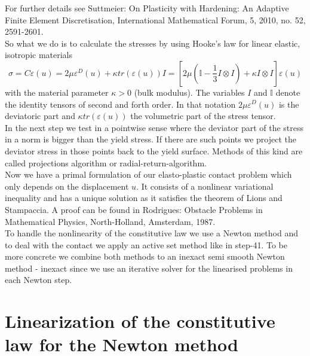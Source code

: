\documentclass{article}
\begin{document}
For further details see Suttmeier: On Plasticity with Hardening:
An Adaptive Finite Element Discretisation, International Mathematical Forum, 5,
2010, no. 52, 2591-2601.\\
So what we do is to calculate the stresses
by using Hooke's law for linear elastic,  isotropic materials $$\sigma = C \varepsilon(u) = 2\mu \varepsilon^D(u) + \kappa tr(\varepsilon(u))I = \left[2\mu\left(\mathbb{I} -\dfrac{1}{3} I\otimes I\right) + \kappa I\otimes I\right]\varepsilon(u)$$
with the material parameter $\kappa>0$ (bulk modulus). The variables $I$ and
$\mathbb{I}$ denote the identity tensors of second and forth order. In that
notation $2\mu \varepsilon^D(u)$ is the deviatoric part and $\kappa
tr(\varepsilon(u))$ the volumetric part of the stress tensor.\\
In the next step we test in a pointwise sense where the deviator part of the
stress in a norm is bigger than the yield stress. If there are such points we
project the deviator stress in those points back to the yield surface. Methods of this kind are called projections algorithm or radial-return-algorithm.\\
Now we have a primal formulation of our elasto-plastic contact problem which only depends on the displacement $u$.
It consists of a nonlinear variational inequality and has a unique solution as
it satisfies the theorem of Lions and Stampaccia. A proof can be found in
Rodrigues: Obstacle Problems in Mathematical Physics, North-Holland, Amsterdam,
1987.\\
To handle the nonlinearity of the constitutive law we use a Newton method and to deal with the contact we apply an
active set method like in step-41. To be more concrete we combine both methods to an inexact semi smooth Newton
method - inexact since we use an iterative solver for the linearised problems in each Newton step.

\section{Linearization of the constitutive law for the Newton method}
\end{document}

